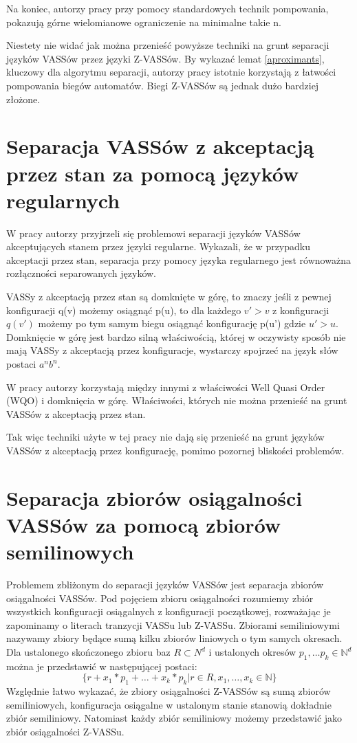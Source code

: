     Na koniec, autorzy pracy przy pomocy standardowych technik pompowania, pokazują górne wielomianowe ograniczenie na minimalne takie n.

    Niestety nie widać jak można przenieść powyższe techniki na grunt separacji języków VASSów przez języki Z-VASSów.
    By wykazać lemat \ref{aproximants}, kluczowy dla algorytmu separacji, autorzy pracy istotnie korzystają z łatwości pompowania biegów automatów.
    Biegi Z-VASSów są jednak dużo bardziej złożone.


    \section{Separacja VASSów z akceptacją przez stan za pomocą języków regularnych}
    W pracy  \cite{sep1} autorzy przyjrzeli się problemowi separacji języków VASSów akceptujących stanem przez języki regularne.
    Wykazali, że w przypadku akceptacji przez stan, separacja przy pomocy języka regularnego jest równoważna rozłączności
    separowanych języków.

    VASSy z akceptacją przez stan są domknięte w górę, to znaczy jeśli z pewnej konfiguracji q(v) możemy osiągnąć p(u),
    to dla każdego $v' > v$ z konfiguracji $q(v')$ możemy po tym samym biegu osiągnąć konfigurację p(u') gdzie $u' > u$.
    Domknięcie w górę jest bardzo silną właściwością, której w oczywisty sposób nie mają VASSy z akceptacją przez konfiguracje,
    wystarczy spojrzeć na język słów postaci $a^n b^n$.


    W pracy autorzy korzystają między innymi z właściwości Well Quasi Order (WQO) i domknięcia w górę.
    Właściwości, których nie można przenieść na grunt VASSów z akceptacją przez stan.

    Tak więc techniki użyte w tej pracy nie dają się przenieść na grunt języków VASSów z akceptacją przez konfigurację,
    pomimo pozornej bliskości problemów.

    \section{Separacja zbiorów osiągalności VASSów za pomocą zbiorów semilinowych}
    Problemem zbliżonym do separacji języków VASSów jest separacja zbiorów osiągalności VASSów.
    Pod pojęciem zbioru osiągalności rozumiemy zbiór wszystkich konfiguracji osiągalnych z konfiguracji początkowej,
    rozważając je zapominamy o literach tranzycji VASSu lub Z-VASSu.
    Zbiorami semiliniowymi nazywamy zbiory będące sumą kilku zbiorów liniowych o tym samych okresach.
    Dla ustalonego skończonego zbioru baz $R \subset N^d$ i ustalonych okresów $p_1, \dots p_k \in \mathbb{N}^d$
    można je przedstawić w następującej postaci:
    \[\{r+x_1*p_1+\dots+x_k*p_k | r \in R, x_1, \dots ,x_k \in \mathbb{N}\}\]
    Względnie łatwo wykazać, że zbiory osiągalności Z-VASSów są sumą zbiorów semiliniowych, konfiguracja osiągalne w ustalonym stanie
    stanowią dokładnie zbiór semiliniowy.
    Natomiast każdy zbiór semiliniowy możemy przedstawić jako zbiór osiągalności Z-VASSu.

